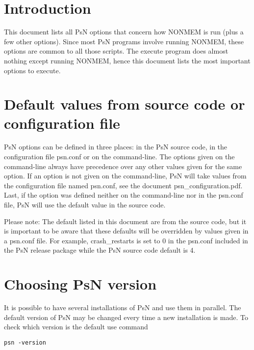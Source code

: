 



\maketitle

\section{Introduction}
This document lists all PsN options that concern how NONMEM is run (plus a few other options). Since
most PsN programs involve running NONMEM, these options are common to all those scripts.
The execute program does almost nothing except running NONMEM, hence this document lists the most important options
to execute.

\section{Default values from source code or configuration file}
PsN options can be defined in three places: in the PsN source code, in the configuration file psn.conf or on the command-line. The options given on the command-line always have precedence over any other values given for the same option. If an option is not given on the command-line, PsN will take values from the configuration file named psn.conf, see the document psn\_configuration.pdf. Last, if the option was defined neither on the command-line nor in the psn.conf file, PsN will use the default value in the source code. 

Please note: The default listed in this document are from the source code, but it is important to be aware that these defaults will be overridden by values given in a psn.conf file. For example, crash\_restarts is set to 0 in the psn.conf included in the PsN release package while the PsN source code default is 4. 

\section{Choosing PsN version}
It is possible to have several installations of PsN and use them in parallel. The default version of PsN may be changed every time a new installation is made. To check which version is the default use command
\begin{verbatim}
psn -version
\end{verbatim}

